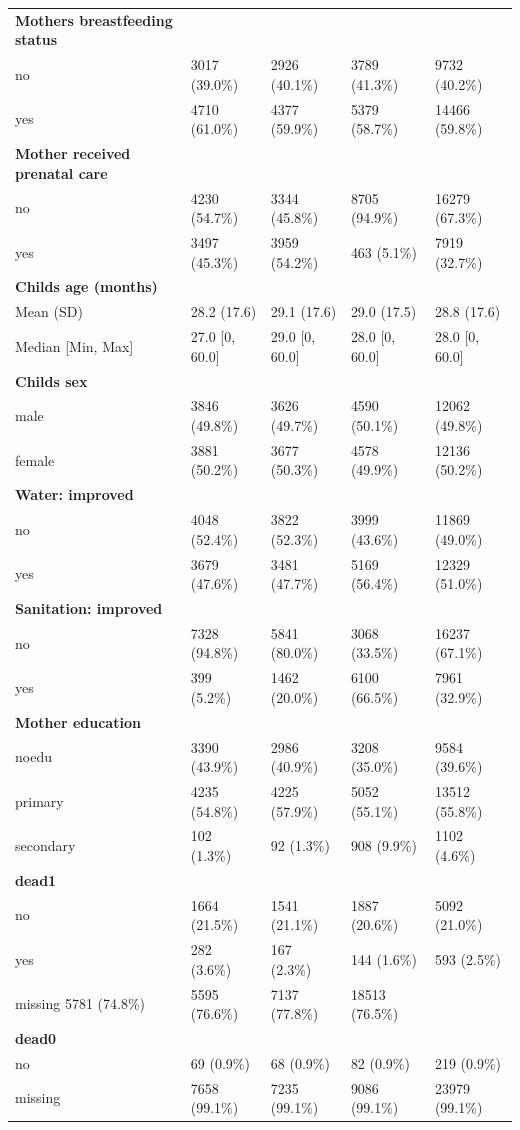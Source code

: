 \documentclass[a4paper, 11pt]{article} %
\begin{document}
\begin{table}[htbp]
{\begin{tabular}{lllll}
\textbf{Mothers breastfeeding status} & & & &  \\						
no &	3017 (39.0\%) &	2926 (40.1\%) &	3789 (41.3\%) & 9732 (40.2\%) \\
yes &	4710 (61.0\%) &	4377 (59.9\%) &	5379 (58.7\%) & 14466 (59.8\%) \\ \hline
\textbf{Mother received prenatal care} & & & &  \\						
no &	4230 (54.7\%) &	3344 (45.8\%) &	8705 (94.9\%) & 16279 (67.3\%) \\
yes &	3497 (45.3\%) &	3959 (54.2\%) &	463 (5.1\%) & 7919 (32.7\%) \\ \hline
\textbf{Childs age (months)} & & & &  \\						
Mean (SD) &	28.2 (17.6) &	29.1 (17.6) &	29.0 (17.5) & 28.8 (17.6) \\
Median [Min, Max] &	27.0 [0, 60.0] &	29.0 [0, 60.0] & 28.0 [0, 60.0]	& 28.0 [0, 60.0] \\ \hline
\textbf{Childs sex} & & & &  \\						
male &	3846 (49.8\%) &	3626 (49.7\%) &	4590 (50.1\%) & 12062 (49.8\%) \\
female &	3881 (50.2\%) &	3677 (50.3\%) &	4578 (49.9\%) & 12136 (50.2\%) \\ \hline
\textbf{Water: improved} & & & &  \\						
no &	4048 (52.4\%) &	3822 (52.3\%) &	3999 (43.6\%) & 11869 (49.0\%) \\
yes &	3679 (47.6\%) &	3481 (47.7\%) &	5169 (56.4\%) & 12329 (51.0\%) \\ \hline
\textbf{Sanitation: improved} & & & &  \\						
no &	7328 (94.8\%) &	5841 (80.0\%) &	3068 (33.5\%) & 16237 (67.1\%) \\
yes &	399 (5.2\%) &	1462 (20.0\%) &	6100 (66.5\%) & 7961 (32.9\%) \\ \hline
\textbf{Mother education} & & & &  \\						
noedu &	3390 (43.9\%) &	2986 (40.9\%) &	3208 (35.0\%) & 9584 (39.6\%) \\
primary &	4235 (54.8\%) &	4225 (57.9\%) &	5052 (55.1\%) & 13512 (55.8\%) \\
secondary &	102 (1.3\%) &	92 (1.3\%) &	908 (9.9\%) & 1102 (4.6\%) \\ \hline
\textbf{dead1} & & & &  \\						
no &	1664 (21.5\%) &	1541 (21.1\%) &	1887 (20.6\%) & 5092 (21.0\%) \\
yes &	282 (3.6\%) &	167 (2.3\%) &	144 (1.6\%) & 593 (2.5\%) \\
missing	5781 (74.8\%) &	5595 (76.6\%) &	7137 (77.8\%) & 18513 (76.5\%) \\ \hline
\textbf{dead0} & & & &  \\						
no &	69 (0.9\%) &	68 (0.9\%) &	82 (0.9\%) & 219 (0.9\%) \\
missing &	7658 (99.1\%) &	7235 (99.1\%) &	9086 (99.1\%) & 23979 (99.1\%) \\ \hline
\end{tabular}
}
\end{table}
\end{document}
